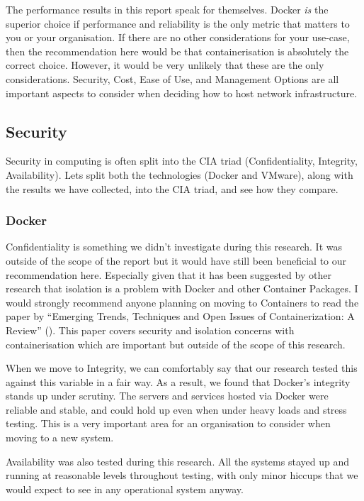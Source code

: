 The performance results in this report speak for themselves. Docker \emph{is} the superior choice if performance and reliability is the only metric that matters to you or your organisation. If there are no other considerations for your use-case, then the recommendation here would be that containerisation is absolutely the correct choice. However, it would be very unlikely that these are the only considerations. Security, Cost, Ease of Use, and Management Options are all important aspects to consider when deciding how to host network infrastructure.
\subsection{Security}
\label{conclandreccoSecurity}
Security in computing is often split into the CIA triad (Confidentiality, Integrity, Availability). Lets split both the technologies (Docker and VMware), along with the results we have collected, into the CIA triad, and see how they compare.
\subsubsection{Docker}
Confidentiality is something we didn't investigate during this research. It was outside of the scope of the report but it would have still been beneficial to our recommendation here. Especially given that it has been suggested by other research that isolation is a problem with Docker and other Container Packages. I would strongly recommend anyone planning on moving to Containers to read the paper by \citeauthor{watanda19} ``Emerging Trends, Techniques and Open Issues of Containerization: A Review'' (\citeyear{watanda19}). This paper covers security and isolation concerns with containerisation which are important but outside of the scope of this research.

When we move to Integrity, we can comfortably say that our research tested this against this variable in a fair way. As a result, we found that Docker's integrity stands up under scrutiny. The servers and services hosted via Docker were reliable and stable, and could hold up even when under heavy loads and stress testing. This is a very important area for an organisation to consider when moving to a new system.

Availability was also tested during this research. All the systems stayed up and running at reasonable levels throughout testing, with only minor hiccups that we would expect to see in any operational system anyway.

